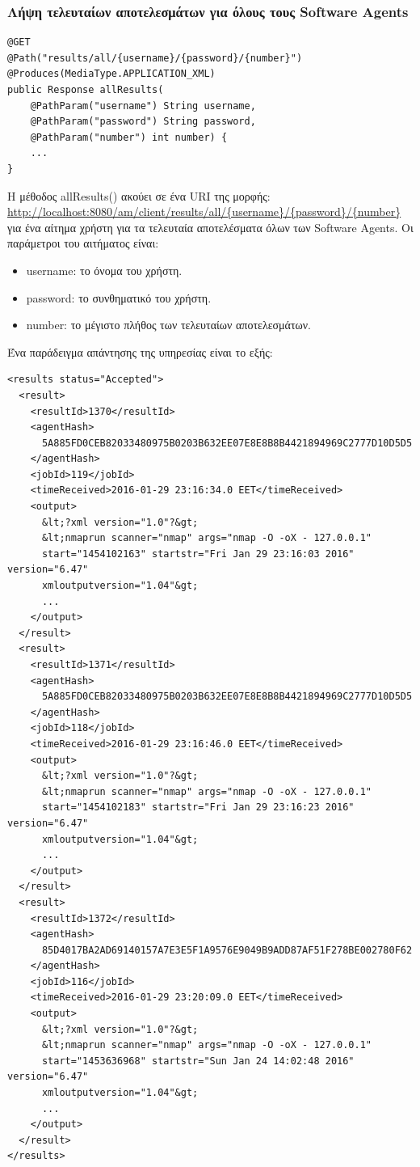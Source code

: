\documentclass[a4paper,11pt]{article}
\begin{document}
\begin{sloppypar}
\subsubsection{Λήψη τελευταίων αποτελεσμάτων για όλους τους Software Agents}
\begin{lstlisting}
@GET
@Path("results/all/{username}/{password}/{number}")
@Produces(MediaType.APPLICATION_XML)
public Response allResults(
    @PathParam("username") String username,
    @PathParam("password") String password,
    @PathParam("number") int number) {
    ...
}
\end{lstlisting}
Η μέθοδος allResults() ακούει σε ένα URI της μορφής:
\\
\url{http://localhost:8080/am/client/results/all/{username}/{password}/{number}} για ένα αίτημα χρήστη για τα τελευταία αποτελέσματα όλων των Software Agents. Οι παράμετροι του αιτήματος είναι:
\begin{itemize}

\item username: το όνομα του χρήστη.
\item password: το συνθηματικό του χρήστη.
\item number: το μέγιστο πλήθος των τελευταίων αποτελεσμάτων.
\end{itemize}
Ένα παράδειγμα απάντησης της υπηρεσίας είναι το εξής:
\begin{lstlisting}
<results status="Accepted">
  <result>
    <resultId>1370</resultId>
    <agentHash>
      5A885FD0CEB82033480975B0203B632EE07E8E8B8B4421894969C2777D10D5D5
    </agentHash>
    <jobId>119</jobId>
    <timeReceived>2016-01-29 23:16:34.0 EET</timeReceived>
    <output>
      &lt;?xml version="1.0"?&gt;
      &lt;nmaprun scanner="nmap" args="nmap -O -oX - 127.0.0.1"
      start="1454102163" startstr="Fri Jan 29 23:16:03 2016" version="6.47"
      xmloutputversion="1.04"&gt;
      ...
    </output>
  </result>
  <result>
    <resultId>1371</resultId>
    <agentHash>
      5A885FD0CEB82033480975B0203B632EE07E8E8B8B4421894969C2777D10D5D5
    </agentHash>
    <jobId>118</jobId>
    <timeReceived>2016-01-29 23:16:46.0 EET</timeReceived>
    <output>
      &lt;?xml version="1.0"?&gt;
      &lt;nmaprun scanner="nmap" args="nmap -O -oX - 127.0.0.1"
      start="1454102183" startstr="Fri Jan 29 23:16:23 2016" version="6.47"
      xmloutputversion="1.04"&gt;
      ...
    </output>
  </result>
  <result>
    <resultId>1372</resultId>
    <agentHash>
      85D4017BA2AD69140157A7E3E5F1A9576E9049B9ADD87AF51F278BE002780F62
    </agentHash>
    <jobId>116</jobId>
    <timeReceived>2016-01-29 23:20:09.0 EET</timeReceived>
    <output>
      &lt;?xml version="1.0"?&gt;
      &lt;nmaprun scanner="nmap" args="nmap -O -oX - 127.0.0.1"
      start="1453636968" startstr="Sun Jan 24 14:02:48 2016" version="6.47"
      xmloutputversion="1.04"&gt;
      ...
    </output>
  </result>
</results>
\end{lstlisting}


\end{sloppypar}
\end{document}

